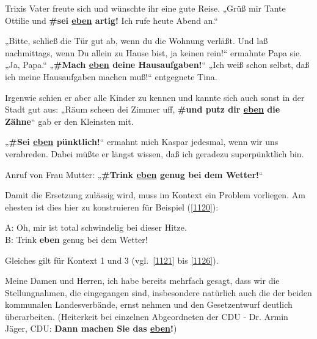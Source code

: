 \begin{exe}
	\ex\label{1115} 
	Trixis Vater freute sich und wünschte ihr eine gute Reise. „Grüß  mir Tante Ottilie und \textbf{\#sei \ul{eben} artig!} Ich rufe heute 			Abend an.“
\end{exe}	
	
\begin{exe}
	\ex\label{1116} 

	„Bitte, schließ die Tür gut ab, wenn du die Wohnung verläßt. Und laß nachmittags, wenn Du allein zu Hause bist, ja keinen rein!“ ermahnte 		Papa sie.
	„Ja, Papa.“
	„\textbf{\#Mach \ul{eben} deine Hausaufgaben!}“
	„Ich weiß schon selbst, daß ich meine Hausaufgaben machen muß!“ entgegnete Tina.
\end{exe}		

\begin{exe}
	\ex\label{1117} 

	Irgenwie schien er aber alle Kinder zu kennen und kannte sich auch sonst in der Stadt gut aus: „Räum scheen dei Zimmer uff, \textbf{\#und putz dir 	\ul{eben} die Zähne}“ gab er den Kleinsten mit. 
\end{exe}	
		
\begin{exe}
	\ex\label{1118} 

	„\textbf{\#Sei \ul{eben} pünktlich!}“ ermahnt mich Kaspar jedesmal, wenn wir uns verabreden. Dabei müßte er längst wissen, daß ich 		geradezu superpünktlich bin. 
\end{exe}		

\begin{exe}
	\ex\label{1119} 
	Anruf von Frau Mutter: „\textbf{\#Trink \ul{eben} genug bei dem Wetter!}“
\end{exe}	
Damit die Ersetzung zulässig wird, muss im Kontext ein Problem vorliegen. Am ehesten ist dies hier zu konstruieren für Beispiel (\ref{1120}):

\begin{exe}
	\ex\label{1120} 
	A: Oh, mir ist total schwindelig bei dieser Hitze.\\
	B: Trink \textbf{eben} genug bei dem Wetter!
\end{exe}	
Gleiches gilt für Kontext 1 und 3 (vgl.\ \ref{1121} bis \ref{1126}).

\begin{exe}
	\ex\label{1121} 

 	Meine Damen und Herren, ich habe bereits mehrfach gesagt, dass wir die Stellungnahmen, die eingegangen sind, insbesondere natürlich auch die der beiden 	kommunalen Landesverbände, ernst nehmen und den Gesetzentwurf deutlich überarbeiten. (Heiterkeit bei einzelnen Abgeordneten der CDU - Dr. Armin Jäger, 		CDU: \textbf{Dann machen Sie das \ul{eben}!}) 	
\end{exe}

